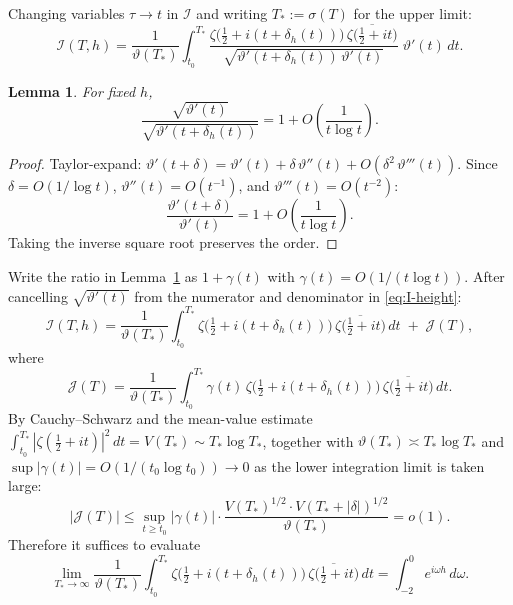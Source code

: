 \documentclass[11pt]{article}
\theoremstyle{plain}
\newtheorem{lemma}[theorem]{Lemma}
\theoremstyle{definition}
\newcommand{\assign}{:=}
\begin{document}
Changing variables $\tau\to t$ in $\mathcal{I}$
and writing $T_*\assign\sigma(T)$ for the upper limit:
\begin{equation}\label{eq:I-height}
\mathcal{I}(T,h)
= \frac{1}{\vartheta(T_*)}
  \int_{t_0}^{T_*}
  \frac{\zeta\bigl(\tfrac{1}{2}+i(t+\delta_h(t))\bigr)\,
        \overline{\zeta\bigl(\tfrac{1}{2}+it\bigr)}}
       {\sqrt{\vartheta'(t+\delta_h(t))\,\vartheta'(t)}}
  \;\vartheta'(t)\,dt.
\end{equation}

\begin{lemma}\label{lem:jacobian}
For fixed $h$,
\[
\frac{\sqrt{\vartheta'(t)}}{\sqrt{\vartheta'(t+\delta_h(t))}}
= 1 + O\!\left(\frac{1}{t\log t}\right).
\]
\end{lemma}

\begin{proof}
Taylor-expand:
$\vartheta'(t+\delta) = \vartheta'(t) + \delta\,\vartheta''(t)
 + O(\delta^2\,\vartheta'''(t))$.
Since $\delta=O(1/\log t)$, $\vartheta''(t)=O(t^{-1})$,
and $\vartheta'''(t)=O(t^{-2})$:
\[
\frac{\vartheta'(t+\delta)}{\vartheta'(t)}
= 1 + O\!\left(\frac{1}{t\log t}\right).
\]
Taking the inverse square root preserves the order.
\end{proof}

Write the ratio in Lemma~\ref{lem:jacobian} as $1+\gamma(t)$
with $\gamma(t)=O(1/(t\log t))$.
After cancelling $\sqrt{\vartheta'(t)}$ from the numerator
and denominator in \eqref{eq:I-height}:
\begin{equation}\label{eq:I-simplified}
\mathcal{I}(T,h)
= \frac{1}{\vartheta(T_*)}
  \int_{t_0}^{T_*}
  \zeta\bigl(\tfrac{1}{2}+i(t+\delta_h(t))\bigr)\,
  \overline{\zeta\bigl(\tfrac{1}{2}+it\bigr)}
  \,dt
  \;+\; \mathcal{J}(T),
\end{equation}
where
\[
\mathcal{J}(T)
= \frac{1}{\vartheta(T_*)}
  \int_{t_0}^{T_*}
  \gamma(t)\,
  \zeta\bigl(\tfrac{1}{2}+i(t+\delta_h(t))\bigr)\,
  \overline{\zeta\bigl(\tfrac{1}{2}+it\bigr)}
  \,dt.
\]
By Cauchy--Schwarz and the mean-value estimate
$\int_{t_0}^{T_*}|\zeta(\tfrac{1}{2}+it)|^2\,dt
= V(T_*) \sim T_*\log T_*$,
together with $\vartheta(T_*)\asymp T_*\log T_*$
and $\sup|\gamma(t)|=O(1/(t_0\log t_0))\to 0$
as the lower integration limit is taken large:
\[
|\mathcal{J}(T)|
\le
\sup_{t\ge t_0}|\gamma(t)|
\cdot
\frac{V(T_*)^{1/2}\cdot V(T_*+|\delta|)^{1/2}}
     {\vartheta(T_*)}
= o(1).
\]
Therefore it suffices to evaluate
\begin{equation}\label{eq:need}
\lim_{T_*\to\infty}
\frac{1}{\vartheta(T_*)}
\int_{t_0}^{T_*}
\zeta\bigl(\tfrac{1}{2}+i(t+\delta_h(t))\bigr)\,
\overline{\zeta\bigl(\tfrac{1}{2}+it\bigr)}
\,dt
= \int_{-2}^{0} e^{i\omega h}\,d\omega.
\end{equation}
\end{document}
